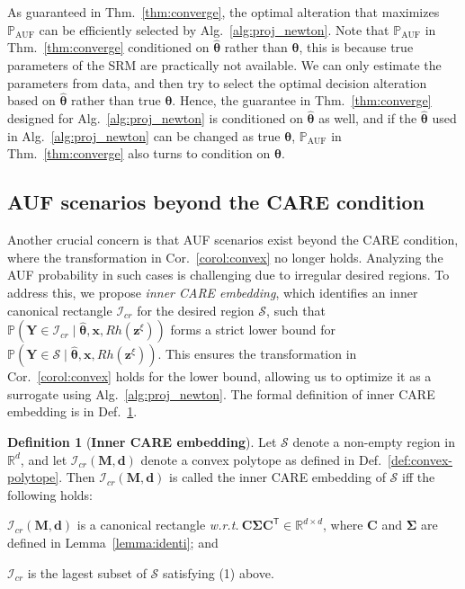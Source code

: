 \documentclass{article}
\theoremstyle{plain}
\theoremstyle{definition}
\newtheorem{definition}[theorem]{Definition}
\def \x {\mathbf{x}}
\def \M {\mathbf{M}}
\def \Y{\mathbf{Y}}
\def \wrt {\textit{w.r.t.}$\ $}
\def \x {\mathbf{x}}
\def \sI {\mathcal{I}}
\def \sS {\mathcal{S}}
\def \Y {\mathbf{Y}}
\def \M {\mathbf{M}}
\def \C {\mathbf{C}}
\def \z {\mathbf{z}}
\def \d {\mathbf{d}}
\begin{document}
As guaranteed in Thm.~\ref{thm:converge}, the optimal alteration that maximizes \(\mathbb{P}_{\operatorname{AUF}}\)  can be efficiently selected by Alg.~\ref{alg:proj_newton}. 
Note that \(\mathbb{P}_{\operatorname{AUF}}\) in Thm.~\ref{thm:converge} conditioned on $\hat{\bm{\theta}}$ rather than $\bm{\theta}$, this is because true parameters of the SRM are practically not available. 
We can only estimate the parameters from data, and then try to select the optimal decision alteration based on $\hat{\bm{\theta}}$ rather than true $\bm{\theta}$. 
Hence, the guarantee in Thm.~\ref{thm:converge} designed for Alg.~\ref{alg:proj_newton} is conditioned on $\hat{\bm{\theta}}$ as well, and if the $\hat{\bm{\theta}}$ used in Alg.~\ref{alg:proj_newton} can be changed as true $\bm{\theta}$, \(\mathbb{P}_{\operatorname{AUF}}\) in Thm.~\ref{thm:converge} also turns to condition on $\bm{\theta}$.

\subsection{AUF scenarios beyond the CARE condition}

\label{sec:inner}

Another crucial concern is that AUF scenarios exist beyond the CARE condition, where the transformation in Cor.~\ref{corol:convex} no longer holds. 
Analyzing the AUF probability in such cases is challenging due to irregular desired regions. 
To address this, we propose \emph{inner CARE embedding}, which identifies an inner canonical rectangle \(\sI_{cr}\) for the desired region \(\sS\), such that \(\mathbb{P}(\Y \in \sI_{cr}\mid \hat{\bm{\theta}}, \x, Rh(\z^\xi))\) forms a strict lower bound for \(\mathbb{P}(\Y \in \sS\mid \hat{\bm{\theta}}, \x, Rh(\z^\xi))\). This ensures the transformation in Cor.~\ref{corol:convex} holds for the lower bound, allowing us to optimize it as a surrogate using Alg.~\ref{alg:proj_newton}. The formal definition of inner CARE embedding is in Def.~\ref{def:inner-embedding}.


\begin{definition}[\textbf{Inner CARE embedding}]
  \label{def:inner-embedding}
  Let $\sS$ denote a non-empty region in $\mathbb{R}^{d}$, and let $\sI_{cr}\left(\M, \d\right)$ denote a convex polytope as defined in Def.~\ref{def:convex-polytope}.
  Then $\sI_{cr}\left(\M, \d\right)$ is called the inner CARE embedding of $\sS$ iff the following holds:
  \vspace*{-0.06in}
  \begin{compactenum}
    \item[(1)] $\sI_{cr}\left(\M, \d\right)$ is a canonical rectangle \wrt $\C\bm{\Sigma}\C^\mathsf{T}\in\mathbb{R}^{d\times d}$, where $\C$ and $\bm{\Sigma}$ are defined in Lemma~\ref{lemma:identi}; and
     \vspace*{0.03in}
    \item[(2)] $\sI_{cr}$ is the lagest subset of $\sS$ satisfying (1) above.
  \end{compactenum}
\end{definition}
\end{document}
